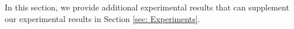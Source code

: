 In this section, we provide additional experimental results that can supplement our experimental results in Section \ref{sec: Experiments}.




% 









